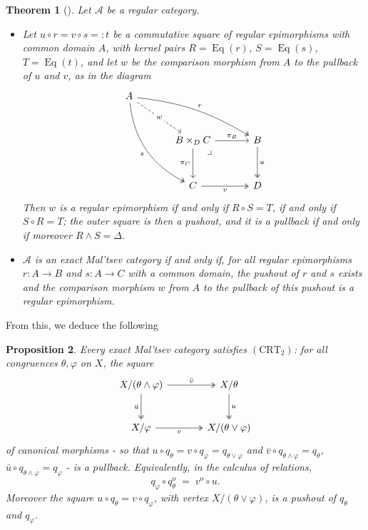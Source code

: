 \documentclass[11pt,a4paper]{article}
\theoremstyle{plain}
\newtheorem{theoreme}{Theorem}[section]
\newtheorem{proposition}[theoreme]{Proposition}
\theoremstyle{definition}
\theoremstyle{remark}
\theoremstyle{plain}
\newcommand{\Eq}{\operatorname{Eq}}
\newcommand{\op}{\mathrm{o}}
\begin{document}
\begin{theoreme}[{\cite[Theorems 5.2 and 5.7]{CKP}}]\label{thm:ckp57}
Let $\mathcal{A}$ be a regular category.
\begin{itemize}
\item[(a)] Let $u \circ r = v \circ s =: t$ be a commutative square of regular
epimorphisms with common domain $A$, with kernel pairs $R = \Eq(r)$,
$S = \Eq(s)$, $T = \Eq(t)$, and let $w$ be the comparison morphism from $A$
to the pullback of $u$ and $v$, as in the diagram
\[
\begin{tikzcd}[column sep=3.4em, row sep=3em]
A
\arrow[drr, two heads, bend left=12, "r"]
\arrow[ddr, two heads, bend right=28, "s"']
\arrow[dr, dashed, "w" description] & & \\
& B \times_D C
\arrow[r, "\pi_B"]
\arrow[d, "\pi_C"']
\arrow[dr, phantom, pos=0.12, "\lrcorner"] &
B \arrow[d, two heads, "u"] \\
& C \arrow[r, two heads, "v"'] & D
\end{tikzcd}
\]
Then $w$ is a regular epimorphism if and only if
$R \circ S = T$, if and only if $S \circ R = T$; the outer square is then a
pushout, and it is a
pullback if and only if moreover $R \wedge S = \Delta$.
\item[(b)] $\mathcal{A}$ is an exact Mal'tsev category if and only if, for
all regular epimorphisms $r \colon A \to B$ and $s \colon A \to C$ with a
common domain, the pushout of $r$ and $s$ exists and the comparison morphism
$w$ from $A$ to the pullback of this pushout is a regular epimorphism.
\end{itemize}
\end{theoreme}
From this, we deduce the following
\begin{proposition}\label{prop:binaire}
Every exact Mal'tsev category satisfies $(\mathrm{CRT}_2)$: for all
congruences $\theta, \varphi$ on $X$, the square
\[
\begin{tikzcd}[column sep=3.6em, row sep=2.6em]
X/(\theta \wedge \varphi)
\arrow[r, two heads, "\bar v"]
\arrow[d, two heads, "\bar u"'] &
X/\theta
\arrow[d, two heads, "u"] \\
X/\varphi
\arrow[r, two heads, "v"'] &
X/(\theta \vee \varphi)
\end{tikzcd}
\]
of canonical morphisms - so that
$u \circ q_\theta = v \circ q_\varphi = q_{\theta\vee\varphi}$ and
$\bar v \circ q_{\theta\wedge\varphi} = q_\theta$,
$\bar u \circ q_{\theta\wedge\varphi} = q_\varphi$ - is a pullback.
Equivalently, in the calculus of relations,
\[
q_\varphi \circ q_\theta^{\op}
\;=\; v^{\op} \circ u .
\]
Moreover the square $u \circ q_\theta = v \circ q_\varphi$, with vertex
$X/(\theta\vee\varphi)$, is a pushout of $q_\theta$ and $q_\varphi$.
\end{proposition}
\end{document}
